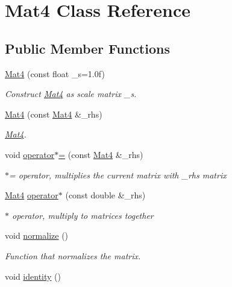\hypertarget{classMat4}{
\section{Mat4 Class Reference}
\label{classMat4}
}
\subsection*{Public Member Functions}
\begin{DoxyCompactItemize}
\item 
\hyperlink{classMat4_ab3c26812d63c39eaf57ef25cdda9c24c}{Mat4} (const float \_\-s=1.0f)
\begin{DoxyCompactList}\small\item\em Construct \hyperlink{classMat4}{Mat4} as scale matrix \_\-s. \item\end{DoxyCompactList}\item 
\hyperlink{classMat4_a962a2d2ba18f96eba15342175237e55c}{Mat4} (const \hyperlink{classMat4}{Mat4} \&\_\-rhs)
\begin{DoxyCompactList}\small\item\em \hyperlink{classMat4}{Mat4}. \item\end{DoxyCompactList}\item 
void \hyperlink{classMat4_a5b8ca6003dee9d49f2a008f1608bebaf}{operator$\ast$=} (const \hyperlink{classMat4}{Mat4} \&\_\-rhs)
\begin{DoxyCompactList}\small\item\em $\ast$= operator, multiplies the current matrix with \_\-rhs matrix \item\end{DoxyCompactList}\item 
\hyperlink{classMat4}{Mat4} \hyperlink{classMat4_a352383553a3abb84b876e222b355be6a}{operator$\ast$} (const double \&\_\-rhs)
\begin{DoxyCompactList}\small\item\em $\ast$ operator, multiply to matrices together \item\end{DoxyCompactList}\item 
\hypertarget{classMat4_ac5095599284b8c470c8e4a2b28321f83}{
void \hyperlink{classMat4_ac5095599284b8c470c8e4a2b28321f83}{normalize} ()}
\label{classMat4_ac5095599284b8c470c8e4a2b28321f83}

\begin{DoxyCompactList}\small\item\em Function that normalizes the matrix. \item\end{DoxyCompactList}\item 
\hypertarget{classMat4_ad4a8d1caecbfd18a61a9fe245e7463ab}{
void \hyperlink{classMat4_ad4a8d1caecbfd18a61a9fe245e7463ab}{identity} ()}
\label{classMat4_ad4a8d1caecbfd18a61a9fe245e7463ab}


\end{DoxyCompactItemize}
